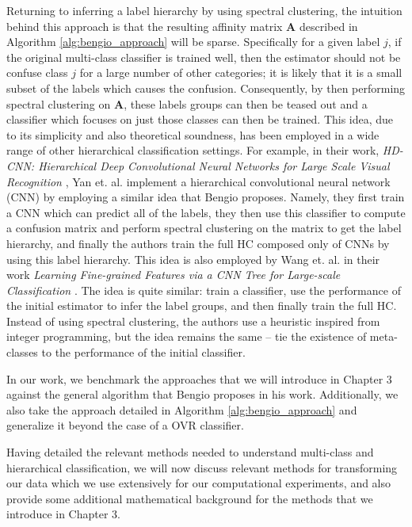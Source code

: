 \documentclass[../thesis.tex]{subfiles}
\begin{document}
Returning to inferring a label hierarchy by using spectral clustering, the
intuition behind this approach is that the resulting affinity matrix
$\mathbf{A}$ described in Algorithm \ref{alg:bengio_approach} will be sparse.
Specifically for a given label $j$, if the original multi-class classifier is
trained well, then the estimator should not be confuse class $j$ for a large
number of other categories; it is likely that it is a small subset of the labels
which causes the confusion. Consequently, by then performing spectral clustering
on $\mathbf{A}$, these labels groups can then be teased out and a classifier
which focuses on just those classes can then be trained. This idea, due to its
simplicity and also theoretical soundness, has been employed in a wide range of
other hierarchical classification settings. For example, in their work,
\textit{HD-CNN: Hierarchical Deep Convolutional Neural Networks for Large Scale
Visual Recognition} \cite{yan2015hd}, Yan et. al. implement a hierarchical
convolutional neural network (CNN) by employing a similar idea that Bengio
proposes. Namely, they first train a CNN which can predict all of the labels,
they then use this classifier to compute a confusion matrix and perform spectral
clustering on the matrix to get the label hierarchy, and finally the authors
train the full HC composed only of CNNs by using this label hierarchy. This idea
is also employed by Wang et. al. in their work \textit{Learning Fine-grained
Features via a CNN Tree for Large-scale Classification} \cite{wang2018learning}.
The idea is quite similar: train a classifier, use the performance of the
initial estimator to infer the label groups, and then finally train the full HC.
Instead of using spectral clustering, the authors use a heuristic inspired from
integer programming, but the idea remains the same -- tie the existence of
meta-classes to the performance of the initial classifier.

In our work, we benchmark the approaches that we will introduce in Chapter 3
against the general algorithm that Bengio proposes in his work. Additionally, we
also take the approach detailed in Algorithm \ref{alg:bengio_approach} and
generalize it beyond the case of a OVR classifier.

Having detailed the relevant methods needed to understand multi-class and
hierarchical classification, we will now discuss relevant methods for
transforming our data which we use extensively for our computational
experiments, and also provide some additional mathematical background for the
methods that we introduce in Chapter 3.
\end{document}
